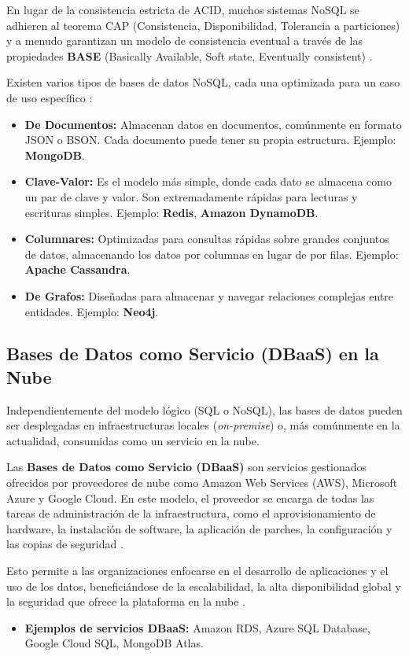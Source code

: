 En lugar de la consistencia estricta de ACID, muchos sistemas NoSQL se adhieren al teorema CAP (Consistencia, Disponibilidad, Tolerancia a particiones) y a menudo garantizan un modelo de consistencia eventual a través de las propiedades \textbf{BASE} (Basically Available, Soft state, Eventually consistent) \cite{mongodb2024sqlvsnosql}.

Existen varios tipos de bases de datos NoSQL, cada una optimizada para un caso de uso específico \cite{aws2024nosql}:
\begin{itemize}
    \item \textbf{De Documentos:} Almacenan datos en documentos, comúnmente en formato JSON o BSON. Cada documento puede tener su propia estructura. Ejemplo: \textbf{MongoDB}.
    \item \textbf{Clave-Valor:} Es el modelo más simple, donde cada dato se almacena como un par de clave y valor. Son extremadamente rápidas para lecturas y escrituras simples. Ejemplo: \textbf{Redis}, \textbf{Amazon DynamoDB}.
    \item \textbf{Columnares:} Optimizadas para consultas rápidas sobre grandes conjuntos de datos, almacenando los datos por columnas en lugar de por filas. Ejemplo: \textbf{Apache Cassandra}.
    \item \textbf{De Grafos:} Diseñadas para almacenar y navegar relaciones complejas entre entidades. Ejemplo: \textbf{Neo4j}.
\end{itemize}

\subsection{Bases de Datos como Servicio (DBaaS) en la Nube}
\label{subsec:dbaas}

Independientemente del modelo lógico (SQL o NoSQL), las bases de datos pueden ser desplegadas en infraestructuras locales (\textit{on-premise}) o, más comúnmente en la actualidad, consumidas como un servicio en la nube.

Las \textbf{Bases de Datos como Servicio (DBaaS)} son servicios gestionados ofrecidos por proveedores de nube como Amazon Web Services (AWS), Microsoft Azure y Google Cloud. En este modelo, el proveedor se encarga de todas las tareas de administración de la infraestructura, como el aprovisionamiento de hardware, la instalación de software, la aplicación de parches, la configuración y las copias de seguridad \cite{azure2024dbaas}.

Esto permite a las organizaciones enfocarse en el desarrollo de aplicaciones y el uso de los datos, beneficiándose de la escalabilidad, la alta disponibilidad global y la seguridad que ofrece la plataforma en la nube \cite{amazon2024rds}.
\begin{itemize}
    \item \textbf{Ejemplos de servicios DBaaS:} Amazon RDS, Azure SQL Database, Google Cloud SQL, MongoDB Atlas.
\end{itemize}
